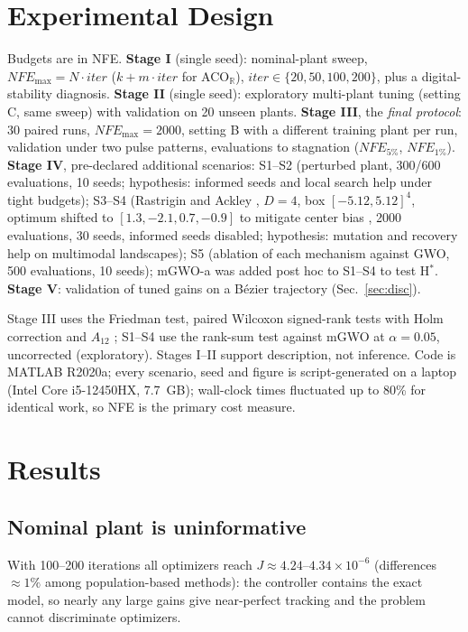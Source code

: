 \documentclass[10pt,journal,compsoc]{IEEEtran}
\newcommand{\mgwo}{mGWO}
\newcommand{\mgwoa}{mGWO-a}
\newcommand{\acor}{ACO$_\mathbb{R}$}
\begin{document}
\section{Experimental Design}\label{sec:design}
Budgets are in NFE. \textbf{Stage I} (single seed): nominal-plant sweep, $NFE_{\max}=N\cdot iter$ ($k+m\cdot iter$ for \acor{}), $iter\in\{20,50,100,200\}$, plus a digital-stability diagnosis. \textbf{Stage II} (single seed): exploratory multi-plant tuning (setting C, same sweep) with validation on 20 unseen plants. \textbf{Stage III}, the \emph{final protocol}: 30 paired runs, $NFE_{\max}=2000$, setting B with a different training plant per run, validation under two pulse patterns, evaluations to stagnation ($NFE_{5\%}$, $NFE_{1\%}$). \textbf{Stage IV}, pre-declared additional scenarios: S1--S2 (perturbed plant, 300/600 evaluations, 10 seeds; hypothesis: informed seeds and local search help under tight budgets); S3--S4 (Rastrigin \cite{torn1989} and Ackley \cite{ackley1987}, $D=4$, box $[-5.12,5.12]^4$, optimum shifted to $[1.3,-2.1,0.7,-0.9]$ to mitigate center bias \cite{suganthan2005}, 2000 evaluations, 30 seeds, informed seeds disabled; hypothesis: mutation and recovery help on multimodal landscapes); S5 (ablation of each mechanism against GWO, 500 evaluations, 10 seeds); \mgwoa{} was added post hoc to S1--S4 to test H$^\ast$. \textbf{Stage V}: validation of tuned gains on a B\'ezier trajectory (Sec.~\ref{sec:disc}).

Stage III uses the Friedman test, paired Wilcoxon signed-rank tests with Holm correction and $A_{12}$ \cite{derrac2011,holm1979,vargha2000}; S1--S4 use the rank-sum test against \mgwo{} at $\alpha=0.05$, uncorrected (exploratory). Stages I--II support description, not inference. Code is MATLAB R2020a; every scenario, seed and figure is script-generated on a laptop (Intel Core i5-12450HX, 7.7~GB); wall-clock times fluctuated up to 80\% for identical work, so NFE is the primary cost measure.

\section{Results}\label{sec:results}

\subsection{Nominal plant is uninformative}
With 100--200 iterations all optimizers reach $J\approx4.24$--$4.34\times10^{-6}$ (differences $\approx1\%$ among population-based methods): the controller contains the exact model, so nearly any large gains give near-perfect tracking and the problem cannot discriminate optimizers.
\end{document}
